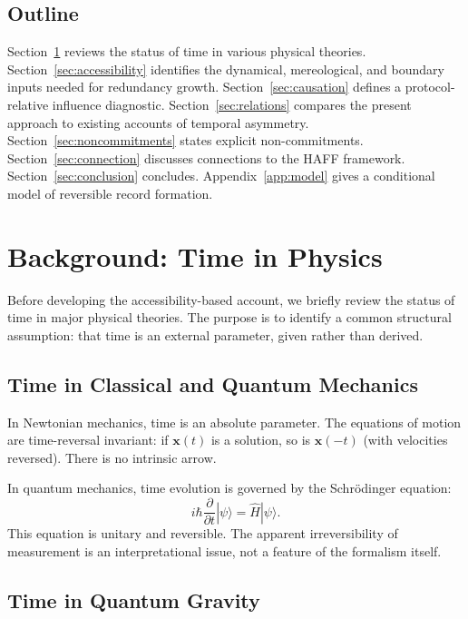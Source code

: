 \documentclass[12pt,a4paper]{article}
\begin{document}
\subsection{Outline}

Section~\ref{sec:background} reviews the status of time in various physical theories. Section~\ref{sec:accessibility} identifies the dynamical, mereological, and boundary inputs needed for redundancy growth. Section~\ref{sec:causation} defines a protocol-relative influence diagnostic. Section~\ref{sec:relations} compares the present approach to existing accounts of temporal asymmetry. Section~\ref{sec:noncommitments} states explicit non-commitments. Section~\ref{sec:connection} discusses connections to the HAFF framework. Section~\ref{sec:conclusion} concludes. Appendix~\ref{app:model} gives a conditional model of reversible record formation.

\section{Background: Time in Physics}
\label{sec:background}

Before developing the accessibility-based account, we briefly review the status of time in major physical theories. The purpose is to identify a common structural assumption: that time is an external parameter, given rather than derived.

\subsection{Time in Classical and Quantum Mechanics}

In Newtonian mechanics, time is an absolute parameter. The equations of motion are time-reversal invariant: if $\mathbf{x}(t)$ is a solution, so is $\mathbf{x}(-t)$ (with velocities reversed). There is no intrinsic arrow.

In quantum mechanics, time evolution is governed by the Schr\"odinger equation:
\begin{equation}
i\hbar \frac{\partial}{\partial t} |\psi\rangle = \hat{H} |\psi\rangle.
\end{equation}
This equation is unitary and reversible. The apparent irreversibility of measurement is an interpretational issue, not a feature of the formalism itself.

\subsection{Time in Quantum Gravity}
\end{document}
